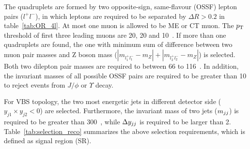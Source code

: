 The \llll quadruplets are formed by two opposite-sign, same-flavour (OSSF) lepton pairs ($l^{+}l^{-}$),
in which leptons are required to be separated by $\Delta R > 0.2$ in table~\ref{tab:OR_4l}.
At most one muon is allowed to be ME or CT muon.
The $p_{\text{T}}$ threshold of first three leading muons are 20, 20 and 10~\gev.
If more than one quadruplets are found, the one with minimum sum of difference between two muon pair masses and Z boson mass 
($|m_{l_{1}^{+}l_{1}^{-}} - m_{Z}| + |m_{l_{2}^{+}l_{2}^{-}} - m_{Z}|$) is selected.
Both two dilepton pair masses are required to between 66 to 116~\gev.
In addition, the invariant masses of all possible OSSF pairs are required to be greater than 10 \gev to reject events from $J/\phi$ or $\Upsilon$ decay.

For VBS topology, the two most energetic jets in different detector side ($y_{j1} \times y_{j2} < 0$) are selected.
Furthermore, the invariant mass of two jets ($m_{jj}$) is required to be greater than 300~\gev, 
while $\Delta y_{jj}$ is required to be larger than 2.
Table~\ref{tab:selection_reco} summarizes the above selection requirements, which is defined as signal region (SR).

